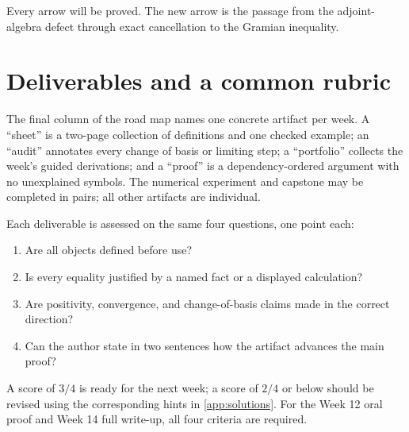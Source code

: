 \documentclass[11pt,oneside,openany]{book}
\theoremstyle{definition}
\theoremstyle{remark}
\newcommand{\alg}{\operatorname{alg}}
\newcommand{\norm}[1]{\left\lVert #1\right\rVert}
\begin{document}
\begin{proofmap}
\begin{center}
\end{center}
Every arrow will be proved.  The new arrow is the passage from the
adjoint-algebra defect through exact cancellation to the Gramian
inequality.
\end{proofmap}

\section*{Deliverables and a common rubric}

The final column of the road map names one concrete artifact per week.
A ``sheet'' is a two-page collection of definitions and one checked
example; an ``audit'' annotates every change of basis or limiting step;
a ``portfolio'' collects the week's guided derivations; and a
``proof'' is a dependency-ordered argument with no unexplained
symbols.  The numerical experiment and capstone may be completed in
pairs; all other artifacts are individual.

Each deliverable is assessed on the same four questions, one point
each:
\begin{enumerate}
  \item Are all objects defined before use?
  \item Is every equality justified by a named fact or a displayed
  calculation?
  \item Are positivity, convergence, and change-of-basis claims made in
  the correct direction?
  \item Can the author state in two sentences how the artifact advances
  the main proof?
\end{enumerate}
A score of \(3/4\) is ready for the next week; a score of \(2/4\) or
below should be revised using the corresponding hints in
\cref{app:solutions}.  For the Week 12 oral proof and Week 14 full
write-up, all four criteria are required.
\end{document}
